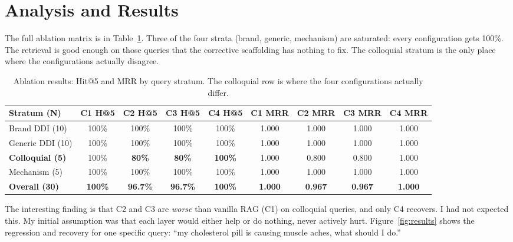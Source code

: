 \documentclass[12pt]{article}
\begin{document}
\section{Analysis and Results}

The full ablation matrix is in Table~\ref{tab:ablation}. Three of the four strata (brand, generic, mechanism) are saturated: every configuration gets 100\%. The retrieval is good enough on those queries that the corrective scaffolding has nothing to fix. The colloquial stratum is the only place where the configurations actually disagree.

\begin{table}[H]
\centering
\small
\caption{Ablation results: Hit@5 and MRR by query stratum. The colloquial row is where the four configurations actually differ.}
\label{tab:ablation}
\begin{tabular}{lcccccccc}
\toprule
\textbf{Stratum (N)} & \textbf{C1 H@5} & \textbf{C2 H@5} & \textbf{C3 H@5} & \textbf{C4 H@5} & \textbf{C1 MRR} & \textbf{C2 MRR} & \textbf{C3 MRR} & \textbf{C4 MRR} \\
\midrule
Brand DDI (10)     & 100\% & 100\% & 100\% & 100\% & 1.000 & 1.000 & 1.000 & 1.000 \\
Generic DDI (10)   & 100\% & 100\% & 100\% & 100\% & 1.000 & 1.000 & 1.000 & 1.000 \\
\textbf{Colloquial (5)} & 100\% & \textbf{80\%}  & \textbf{80\%}  & \textbf{100\%} & 1.000 & 0.800 & 0.800 & 1.000 \\
Mechanism (5)      & 100\% & 100\% & 100\% & 100\% & 1.000 & 1.000 & 1.000 & 1.000 \\
\midrule
\textbf{Overall (30)} & \textbf{100\%} & \textbf{96.7\%} & \textbf{96.7\%} & \textbf{100\%} & \textbf{1.000} & \textbf{0.967} & \textbf{0.967} & \textbf{1.000} \\
\bottomrule
\end{tabular}
\end{table}

The interesting finding is that C2 and C3 are \textit{worse} than vanilla RAG (C1) on colloquial queries, and only C4 recovers. I had not expected this. My initial assumption was that each layer would either help or do nothing, never actively hurt. Figure~\ref{fig:results} shows the regression and recovery for one specific query: ``my cholesterol pill is causing muscle aches, what should I do.''
\end{document}

